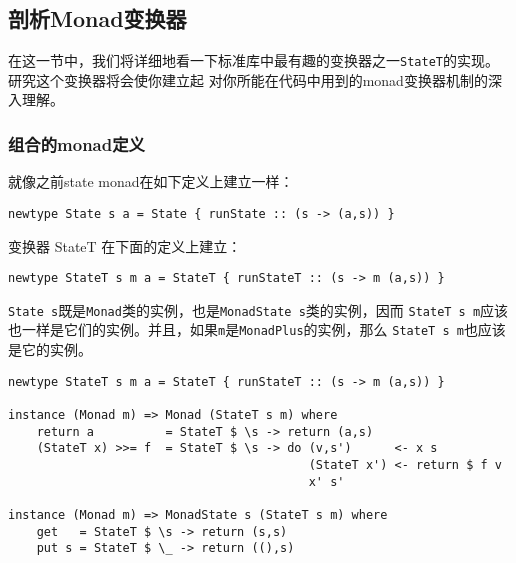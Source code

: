 \subsection{剖析Monad变换器}
\indent{}在这一节中，我们将详细地看一下标准库中最有趣的变换器之一\texttt{StateT}的实现。研究这个变换器将会使你建立起
对你所能在代码中用到的monad变换器机制的深入理解。

\vspace{-0.5em}
\subsubsection{组合的monad定义}
\noindent{}就像之前state monad在如下定义上建立一样：
\begin{verbatim}
newtype State s a = State { runState :: (s -> (a,s)) }
\end{verbatim}
\noindent{}变换器 StateT 在下面的定义上建立：
\begin{verbatim}
newtype StateT s m a = StateT { runStateT :: (s -> m (a,s)) }
\end{verbatim}
\noindent{}\texttt{State s}既是\texttt{Monad}类的实例，也是\texttt{MonadState s}类的实例，因而
\texttt{StateT s m}应该也一样是它们的实例。并且，如果\texttt{m}是\texttt{MonadPlus}的实例，那么
\texttt{StateT s m}也应该是它的实例。
\begin{verbatim}
newtype StateT s m a = StateT { runStateT :: (s -> m (a,s)) }

instance (Monad m) => Monad (StateT s m) where
    return a          = StateT $ \s -> return (a,s)
    (StateT x) >>= f  = StateT $ \s -> do (v,s')      <- x s
                                          (StateT x') <- return $ f v
                                          x' s'

instance (Monad m) => MonadState s (StateT s m) where
    get   = StateT $ \s -> return (s,s)
    put s = StateT $ \_ -> return ((),s)
\end{verbatim}
